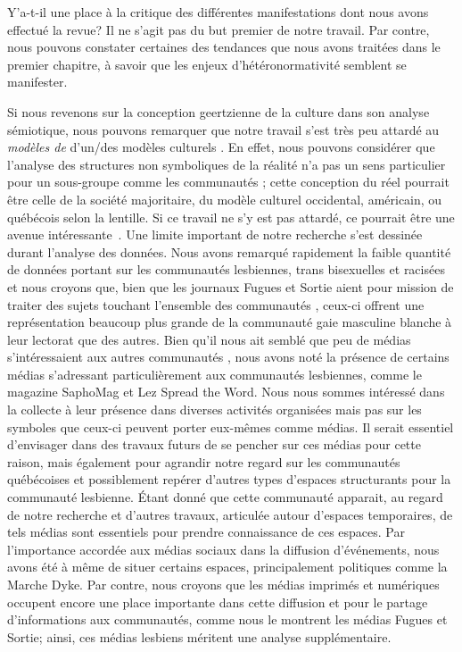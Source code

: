 Y'a-t-il une place à la critique des différentes manifestations dont nous avons effectué la revue?
Il ne s'agit pas du but premier de notre travail.
Par contre, nous pouvons constater certaines des tendances que nous avons traitées dans le premier chapitre, à savoir que les enjeux d'hétéronormativité semblent se manifester.

Si nous revenons sur la conception geertzienne de la culture dans son analyse sémiotique, nous pouvons remarquer que notre travail s'est très peu attardé au \emph{modèles de} d'un/des modèles culturels \lgbt{}.
En effet, nous pouvons considérer  que l'analyse des structures non symboliques de la réalité n'a pas un sens particulier pour un sous-groupe comme les communautés \lgbt{}; cette conception du réel pourrait être celle de la société majoritaire, du modèle culturel occidental, américain, ou québécois selon la lentille.
Si ce travail ne s'y est pas attardé, ce pourrait être une avenue intéressante~.
Une limite important de notre recherche s'est dessinée durant l'analyse des données.
Nous avons remarqué rapidement la faible quantité de données portant sur les communautés lesbiennes, trans bisexuelles et racisées et nous croyons que, bien que les journaux Fugues et Sortie aient pour mission de traiter des sujets touchant l'ensemble des communautés \lgbt{}, ceux-ci offrent une représentation beaucoup plus grande de la communauté gaie masculine blanche à leur lectorat que des autres.
Bien qu'il nous ait semblé que peu de médias s'intéressaient aux autres communautés \lgbt, nous avons noté la présence de certains médias s'adressant particulièrement aux communautés lesbiennes, comme le magazine SaphoMag et Lez Spread the Word.
Nous nous sommes intéressé dans la collecte à leur présence dans diverses activités organisées mais pas sur les symboles que ceux-ci peuvent porter eux-mêmes comme médias.
Il serait essentiel d'envisager dans des travaux futurs de se pencher sur ces médias pour cette raison, mais également pour agrandir notre regard sur les communautés \lgbt québécoises et possiblement repérer d'autres types d'espaces structurants pour la communauté lesbienne.
Étant donné que cette communauté apparait, au regard de notre recherche et d'autres travaux, articulée autour d'espaces temporaires, de tels médias sont essentiels pour prendre connaissance de ces espaces.
Par l'importance accordée aux médias sociaux dans la diffusion d'événements, nous avons été à même de situer certains espaces, principalement politiques comme la Marche Dyke. 
Par contre, nous croyons que les médias imprimés et numériques occupent encore une place importante dans cette diffusion et pour le partage d'informations aux communautés, comme nous le montrent les médias Fugues et Sortie; ainsi, ces médias lesbiens méritent une analyse supplémentaire.

